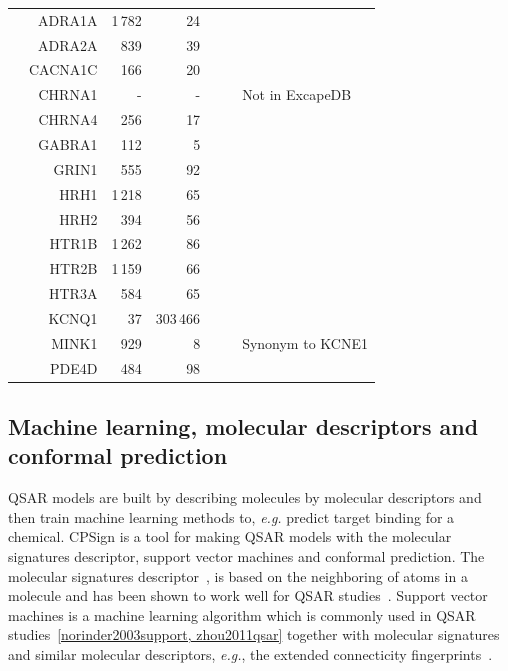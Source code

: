 \documentclass[10pt,article]{memoir}
\renewcommand{\todo}[1]{{\color{magenta}\oldtodo[fancyline]{\color{white}\textsf{#1}}}}
\newcommand{\inlinetodo}[1]{{\color{magenta}\oldtodo[inline]{\color{white}\textsf{#1}}}}
\newenvironment{wideMinipage}
{ \vskip 1\baselineskip
  \noindent   
  \checkoddpage%
  \ifoddpage%
     \hspace*{-3em}%
  \else%
     \hspace*{-3em}%
  \fi%
  \begin{minipage}{1\textwidth + 6em}
}
{ 
    \end{minipage}
    \vskip 1\baselineskip
}
\begin{document}
\begin{table}[p]
\begin{wideMinipage}
\begin{tabular}{crrrrcl}
&    ADRA1A  &       1\,782  &       24          &            &       &       \\
&    ADRA2A  &       839     &       39          &            &       &       \\
&    CACNA1C &       166     &       20          &            &       &       \\
&    CHRNA1  &       -       &       -           &            &       & Not in ExcapeDB \\
&    CHRNA4  &       256     &       17          &            &       &       \\
&    GABRA1  &       112     &       5           &            &       &       \\
&    GRIN1   &       555     &       92          &            &       &       \\
&    HRH1    &       1\,218  &       65          &            &       &       \\
&    HRH2    &       394     &       56          &            &       &       \\
&    HTR1B   &       1\,262  &       86          &            &       &       \\
&    HTR2B   &       1\,159  &       66          &            &       &       \\
&    HTR3A   &       584     &       65          &            &       &       \\
&    KCNQ1   &       37      &       303\,466    &            &       &       \\
&    MINK1   &       929     &       8           &            &       & Synonym to KCNE1 \\
&    PDE4D   &       484     &       98          &            &       &       \\

\bottomrule
\end{tabular}
\end{wideMinipage}
\inlinetodo{Extend caption}
\end{table}

\subsection{Machine learning, molecular descriptors and conformal prediction\todo{add refs}}
QSAR models are built by describing molecules by molecular descriptors and then
train machine learning methods to, \textit{e.g.} predict target binding for a
chemical. CPSign is a tool for making QSAR models with the molecular
signatures descriptor, support vector machines and conformal prediction. The
molecular signatures descriptor~\cite{faulon2003signature}, is based on the
neighboring of atoms in a molecule and has been shown to work well for QSAR
studies~\cite{lapins2018confidence}. Support vector machines is a machine learning
algorithm which is commonly used in QSAR studies~\ref{norinder2003support,
zhou2011qsar} together with molecular signatures and similar molecular
descriptors, \textit{e.g.}, the extended connecticity fingerprints~\cite{rogers2010extended}. 
\end{document}
